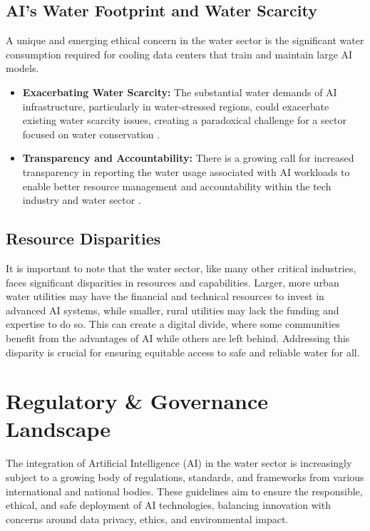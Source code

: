 \subsection{AI's Water Footprint and Water Scarcity}
A unique and emerging ethical concern in the water sector is the significant water consumption required for cooling data centers that train and maintain large AI models.
\begin{itemize}
    \item \textbf{Exacerbating Water Scarcity:} The substantial water demands of AI infrastructure, particularly in water-stressed regions, could exacerbate existing water scarcity issues, creating a paradoxical challenge for a sector focused on water conservation \cite{Illinois_Risks, Investopedia_Risks}.
    \item \textbf{Transparency and Accountability:} There is a growing call for increased transparency in reporting the water usage associated with AI workloads to enable better resource management and accountability within the tech industry and water sector \cite{Illinois_Risks}.
\end{itemize}

\subsection{Resource Disparities}
It is important to note that the water sector, like many other critical industries, faces significant disparities in resources and capabilities. Larger, more urban water utilities may have the financial and technical resources to invest in advanced AI systems, while smaller, rural utilities may lack the funding and expertise to do so. This can create a digital divide, where some communities benefit from the advantages of AI while others are left behind. Addressing this disparity is crucial for ensuring equitable access to safe and reliable water for all.

\section{Regulatory \& Governance Landscape}

The integration of Artificial Intelligence (AI) in the water sector is increasingly subject to a growing body of regulations, standards, and frameworks from various international and national bodies. These guidelines aim to ensure the responsible, ethical, and safe deployment of AI technologies, balancing innovation with concerns around data privacy, ethics, and environmental impact.

